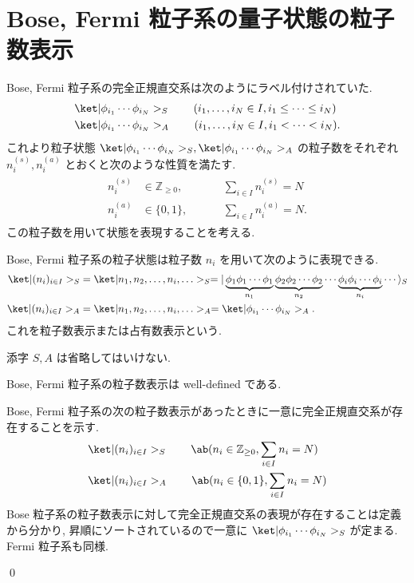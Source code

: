 \documentclass[uplatex,dvipdfmx,a4paper,11pt]{jlreq}
\makeatletter
\newcommand{\ZZ}{\mathbb{Z}}
\numberwithin{equation}{section}
\theoremstyle{definition}
\renewenvironment{proof}[1][\proofname]{\par
  \normalfont
  \topsep6\p@\@plus6\p@ \trivlist
  \item[\hskip\labelsep{\bfseries #1}\@addpunct{\bfseries}]\ignorespaces\quad\par
}{
  \qed\endtrivlist\@endpefalse
}
\renewcommand\proofname{証明}
\makeatother
\begin{document}
\section{Bose, Fermi 粒子系の量子状態の粒子数表示}
Bose, Fermi 粒子系の完全正規直交系は次のようにラベル付けされていた.
\begin{align}
   & \ket|\phi_{i_1}\cdots\phi_{i_N}>_S \qquad (i_1,\ldots,i_N\in I, i_1\leq\cdots\leq i_N) \\
   & \ket|\phi_{i_1}\cdots\phi_{i_N}>_A \qquad (i_1,\ldots,i_N\in I, i_1<\cdots<i_{N}).
\end{align}
これより粒子状態 $\ket|\phi_{i_1}\cdots\phi_{i_N}>_S, \ket|\phi_{i_1}\cdots\phi_{i_N}>_A$ の粒子数をそれぞれ $n_i^{(s)}, n_i^{(a)}$ とおくと次のような性質を満たす.
\begin{align}
  \begin{alignedat}{3}
    n_i^{(s)} & \in \ZZ_{\geq 0}, \qquad && \sum_{i\in I}n_i^{(s)} = N \\
    n_i^{(a)} & \in\{0, 1\}, && \sum_{i\in I}n_i^{(a)} = N.
  \end{alignedat}
\end{align}
この粒子数を用いて状態を表現することを考える.
\begin{definition}
  Bose, Fermi 粒子系の粒子状態は粒子数 $n_i$ を用いて次のように表現できる.
  \begin{align}
    \ket|(n_i)_{i\in I}>_S & = \ket|n_1,n_2,\ldots,n_i,\ldots>_S = |\underbrace{\phi_1\phi_1\cdots\phi_1}_{n_1}\underbrace{\phi_2\phi_2\cdots\phi_2}_{n_2}\cdots\underbrace{\phi_i\phi_i\cdots\phi_i}_{n_i}\cdots\rangle_S \\
    \ket|(n_i)_{i\in I}>_A & = \ket|n_1,n_2,\ldots,n_i,\ldots>_A = \ket|\phi_{i_1}\cdots\phi_{i_N}>_A.
  \end{align}
  これを粒子数表示または占有数表示という.
\end{definition}
添字 $S, A$ は省略してはいけない.

\begin{proposition}
  Bose, Fermi 粒子系の粒子数表示は well-defined である.
  \label{particles well defined}
\end{proposition}
\begin{proof}
  Bose, Fermi 粒子系の次の粒子数表示があったときに一意に完全正規直交系が存在することを示す.
  \begin{align}
     & \ket|(n_i)_{i\in I}>_S \qquad \ab(n_i\in\ZZ_{\geq 0}, \sum_{i\in I}n_i = N) \\
     & \ket|(n_i)_{i\in I}>_A \qquad \ab(n_i\in\{0, 1\}, \sum_{i\in I}n_i = N)
  \end{align}
  Bose 粒子系の粒子数表示に対して完全正規直交系の表現が存在することは定義から分かり, 昇順にソートされているので一意に $\ket|\phi_{i_1}\cdots\phi_{i_N}>_S$ が定まる. Fermi 粒子系も同様.
\end{proof}
\end{document}
